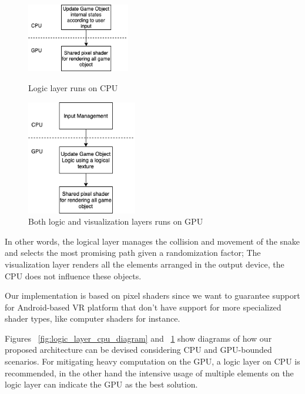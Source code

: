 \documentclass[runningheads]{llncs}
\begin{document}
\begin{figure}
    \centering
    \begin{minipage}[b][6cm][b]{.5\textwidth}
        \centering
        \includegraphics[height=3cm]{hci2020-paper/images/VRSnake_Proposed_Architecture.png}
        \caption{Logic layer runs on CPU}
        \label{fig:logic_layer_cpu_diagram}
    \end{minipage}%
    \begin{minipage}[b][6cm][b]{.5\textwidth}
        \centering
        \includegraphics[height=5cm]{hci2020-paper/images/VRSnake_Proposed_Architecture2.png}
        \caption{Both logic and visualization layers runs on GPU}
        \label{fig:arch_gpu_diagram}
    \end{minipage}
\end{figure}

In other words, the logical layer manages the collision and movement of the snake and selects the most promising path given a randomization factor; The visualization layer renders all the elements arranged in the output device, the CPU does not influence these objects.

Our implementation is based on pixel shaders since we want to guarantee support for Android-based VR platform that don't have support for more specialized shader types, like computer shaders for instance.

Figures ~\ref{fig:logic_layer_cpu_diagram} and ~\ref{fig:arch_gpu_diagram} show diagrams of how our proposed architecture can be devised considering CPU and GPU-bounded scenarios. For mitigating heavy computation on the GPU, a logic layer on CPU is recommended, in the other hand the intensive usage of multiple elements on the logic layer can indicate the GPU as the best solution.
\end{document}
